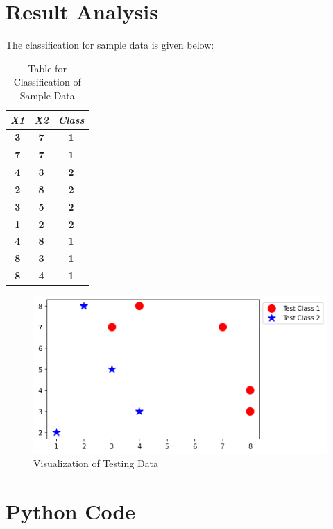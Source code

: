 \documentclass[conference]{IEEEtran}
\begin{document}
\section{Result Analysis}
The classification for sample data is given below:
\begin{table}[htbp]
\caption{Table for Classification of Sample Data}
\begin{center}
\begin{tabular}{|c|c|c|}
\hline
\textbf{\textit{X1}}&\textbf{\textit{X2}}& \textbf{\textit{Class}} \\
\hline
\textbf{{3}}&\textbf{{7}}&   \textbf{{1}} \\
\hline
\textbf{{7}}&\textbf{{7}}&   \textbf{{1}} \\
\hline
\textbf{{4}}&\textbf{{3}}&   \textbf{{2}} \\
\hline
\textbf{{2}}&\textbf{{8}}&   \textbf{{2}} \\
\hline
\textbf{{3}}&\textbf{{5}}&   \textbf{{2}} \\
\hline
\textbf{{1}}&\textbf{{2}}&   \textbf{{2}} \\
\hline
\textbf{{4}}&\textbf{{8}}&   \textbf{{1}} \\
\hline
\textbf{{8}}&\textbf{{3}}&   \textbf{{1}} \\
\hline
\textbf{{8}}&\textbf{{4}}&   \textbf{{1}} \\
\hline

\end{tabular}
\label{tab1}
\end{center}
\end{table}
\begin{figure}[htb!]
\centerline{\includegraphics[scale=0.5]{42.png}}
\caption{Visualization of Testing Data\\}
\label{fig}
\end{figure}
\section{Python Code}
\end{document}
